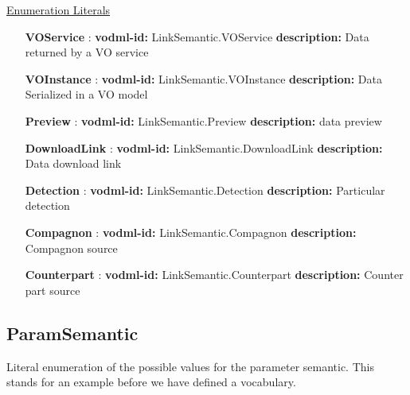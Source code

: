   \noindent \underline{Enumeration Literals}
  \vspace{-\parsep}
  \small
  \begin{itemize}
  
    \item[\textbf{VOService}]: \textbf{vodml-id:} LinkSemantic.VOService \newline
          \textbf{description:} Data returned by a VO service
    \item[\textbf{VOInstance}]: \textbf{vodml-id:} LinkSemantic.VOInstance \newline
          \textbf{description:} Data Serialized in a VO model
    \item[\textbf{Preview}]: \textbf{vodml-id:} LinkSemantic.Preview \newline
          \textbf{description:} data preview
    \item[\textbf{DownloadLink}]: \textbf{vodml-id:} LinkSemantic.DownloadLink \newline
          \textbf{description:} Data download link
    \item[\textbf{Detection}]: \textbf{vodml-id:} LinkSemantic.Detection \newline
          \textbf{description:} Particular detection
    \item[\textbf{Compagnon}]: \textbf{vodml-id:} LinkSemantic.Compagnon \newline
          \textbf{description:} Compagnon source
    \item[\textbf{Counterpart}]: \textbf{vodml-id:} LinkSemantic.Counterpart \newline
          \textbf{description:} Counter part source
  \end{itemize}
  \normalsize


  \subsection{ParamSemantic}
  \label{sect:ParamSemantic}

  Literal enumeration of the possible values for the parameter semantic. This stands for an example before we have defined a vocabulary.

